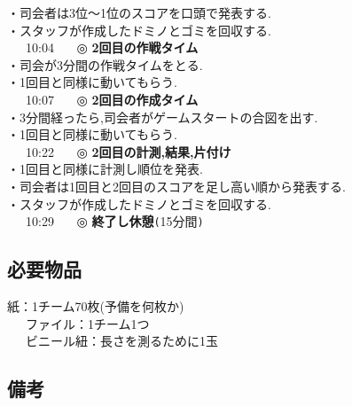 \documentclass[a4j]{jarticle}
\begin{document}
\hspace{15mm}・司会者は3位〜1位のスコアを口頭で発表する.\\
\hspace{15mm}・スタッフが作成したドミノとゴミを回収する.\\
\ \ \ 10:04 \ \ \ ◎ \textbf{2回目の作戦タイム}\\
\hspace{15mm}・司会が3分間の作戦タイムをとる.\\
\hspace{15mm}・1回目と同様に動いてもらう.\\
\ \ \ 10:07 \ \ \ ◎ \textbf{2回目の作成タイム}\\
\hspace{15mm}・3分間経ったら,司会者がゲームスタートの合図を出す.\\
\hspace{15mm}・1回目と同様に動いてもらう.\\
\ \ \ 10:22 \ \ \ ◎ \textbf{2回目の計測,結果,片付け}\\
\hspace{15mm}・1回目と同様に計測し順位を発表.\\
\hspace{15mm}・司会者は1回目と2回目のスコアを足し高い順から発表する.\\
\hspace{15mm}・スタッフが作成したドミノとゴミを回収する.\\
\ \ \ 10:29 \ \ \ ◎ \textbf{終了し休憩}\verb+(+15分間\verb+)+

\subsection{必要物品}
紙：1チーム70枚(予備を何枚か)\\
\ \ \ ファイル：1チーム1つ\\
\ \ \ ビニール紐：長さを測るために1玉

\subsection{備考}
\end{document}
